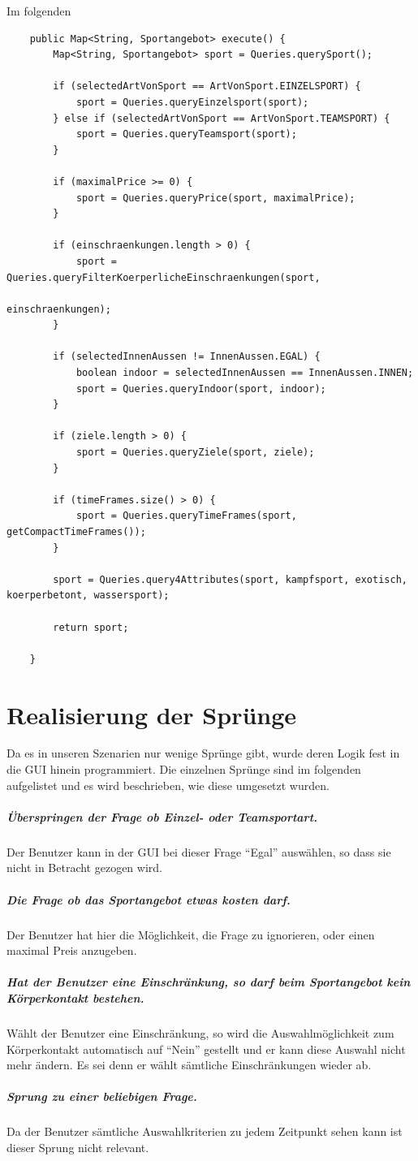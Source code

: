 Im folgenden 

		


\begin{lstlisting}
    public Map<String, Sportangebot> execute() {
        Map<String, Sportangebot> sport = Queries.querySport();

        if (selectedArtVonSport == ArtVonSport.EINZELSPORT) {
            sport = Queries.queryEinzelsport(sport);
        } else if (selectedArtVonSport == ArtVonSport.TEAMSPORT) {
            sport = Queries.queryTeamsport(sport);
        }

        if (maximalPrice >= 0) {
            sport = Queries.queryPrice(sport, maximalPrice);
        }

        if (einschraenkungen.length > 0) {
            sport = Queries.queryFilterKoerperlicheEinschraenkungen(sport,
                                                                   einschraenkungen);
        }

        if (selectedInnenAussen != InnenAussen.EGAL) {
            boolean indoor = selectedInnenAussen == InnenAussen.INNEN;
            sport = Queries.queryIndoor(sport, indoor);
        }

        if (ziele.length > 0) {
            sport = Queries.queryZiele(sport, ziele);
        }

        if (timeFrames.size() > 0) {
            sport = Queries.queryTimeFrames(sport, getCompactTimeFrames());
        }

        sport = Queries.query4Attributes(sport, kampfsport, exotisch, koerperbetont, wassersport);

        return sport;

    }

\end{lstlisting}

\section{Realisierung der Sprünge}
Da es in unseren Szenarien nur wenige Sprünge gibt, wurde deren Logik fest in die GUI hinein programmiert. Die einzelnen Sprünge sind im folgenden aufgelistet und es wird beschrieben, wie diese umgesetzt wurden.

\subparagraph{Überspringen der Frage ob Einzel- oder Teamsportart.} Der Benutzer kann in der GUI bei dieser Frage "`Egal"' auswählen, so dass sie nicht in Betracht gezogen wird.
\subparagraph{Die Frage ob das Sportangebot etwas kosten darf.} Der Benutzer hat hier die Möglichkeit, die Frage zu ignorieren, oder einen maximal Preis anzugeben.
\subparagraph{Hat der Benutzer eine Einschränkung, so darf beim Sportangebot kein Körperkontakt bestehen.} Wählt der Benutzer eine Einschränkung, so wird die Auswahlmöglichkeit zum Körperkontakt automatisch auf "`Nein"' gestellt und er kann diese Auswahl nicht mehr ändern. Es sei denn er wählt sämtliche Einschränkungen wieder ab.
\subparagraph{Sprung zu einer beliebigen Frage.} Da der Benutzer sämtliche Auswahlkriterien zu jedem Zeitpunkt sehen kann ist dieser Sprung nicht relevant.

